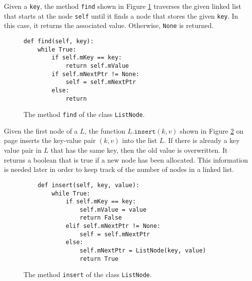 Given a \texttt{key}, the method \texttt{find} shown in Figure \ref{fig:ListNode.ipynb:find} traverses the
given linked list that starts at the node \texttt{self} until it finds a node that stores the 
given \texttt{key}.  In this case, it returns the associated value.  Otherwise, \texttt{None} is returned.

\begin{figure}[!ht]
\centering
\begin{verbatim}
def find(self, key):
    while True:
        if self.mKey == key:
            return self.mValue
        if self.mNextPtr != None:
            self = self.mNextPtr
        else:
            return
\end{verbatim}
\vspace*{-0.3cm}
\caption{The method \texttt{find} of the class \texttt{ListNode}.}
\label{fig:ListNode.ipynb:find}
\end{figure}

Given the first node of a  $L$, the function $L.\texttt{insert}(k, v)$ shown in Figure
\ref{fig:ListNode.ipynb:insert} on page \pageref{fig:ListNode.ipynb:insert} inserts the key-value pair $(k, v)$
into the list $L$.  If there is already a key value pair in $L$ that has the same key, then the old value is
overwritten.  It returns a boolean that is true if a new node has been allocated.  This information is needed
later in order to keep track of the number of nodes in a linked list.

\begin{figure}[!ht]
\centering
\begin{verbatim}
    def insert(self, key, value):
        while True:
            if self.mKey == key:
                self.mValue = value
                return False
            elif self.mNextPtr != None:
                self = self.mNextPtr
            else:
                self.mNextPtr = ListNode(key, value)
                return True
\end{verbatim}
\vspace*{-0.3cm}
\caption{The method \texttt{insert} of the class \texttt{ListNode}.}
\label{fig:ListNode.ipynb:insert}
\end{figure}

